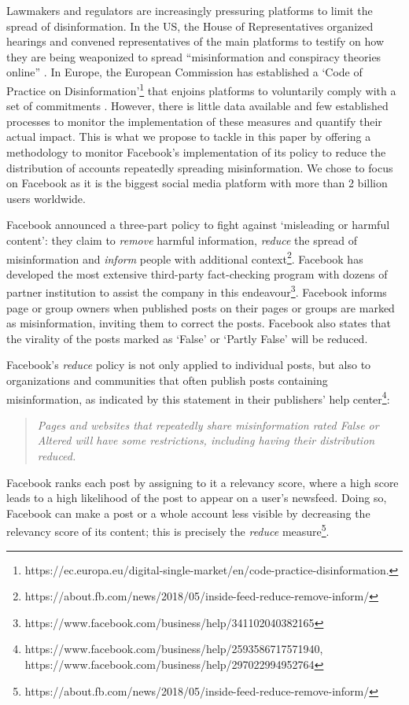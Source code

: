 \documentclass[11pt,a4paper]{article}
\begin{document}
Lawmakers and regulators are increasingly pressuring platforms to limit the spread of disinformation. 
In the US, the House of Representatives organized hearings and convened representatives of the main platforms to testify on how they are being weaponized to spread ``misinformation and conspiracy theories online'' \citep{donovan2020}. 
In Europe, the European Commission has established a `Code of Practice on Disinformation'\footnote{https://ec.europa.eu/digital-single-market/en/code-practice-disinformation.} that enjoins platforms to voluntarily comply with a set of commitments \citep{heldt2019let}. 
However, there is little data available and few established processes to monitor the implementation of these measures and quantify their actual impact. 
This is what we propose to tackle in this paper by offering a methodology to monitor Facebook’s implementation of its policy to reduce the distribution of accounts repeatedly spreading misinformation. 
We chose to focus on Facebook as it is the biggest social media platform with more than 2 billion users worldwide.

Facebook announced a three-part policy to fight against ‘misleading or harmful content’: they claim to \textit{remove} harmful information, \textit{reduce} the spread of misinformation and \textit{inform} people with additional context\footnote{https://about.fb.com/news/2018/05/inside-feed-reduce-remove-inform/}. 
Facebook has developed the most extensive third-party fact-checking program with dozens of partner institution to assist the company in this endeavour\footnote{https://www.facebook.com/business/help/341102040382165}.
Facebook informs page or group owners when published posts on their pages or groups are marked as misinformation, inviting them to correct the posts.
Facebook also states that the virality of the posts marked as `False' or `Partly False' will be reduced.

Facebook’s \textit{reduce} policy is not only applied to individual posts, but also to organizations and communities that often publish posts containing misinformation, as indicated by this statement in their publishers’ help center\footnote{https://www.facebook.com/business/help/2593586717571940, https://www.facebook.com/business/help/297022994952764}: 
\begin{quote}
\emph{Pages and websites that repeatedly share misinformation rated False or Altered will have some restrictions, including having their distribution reduced.}
\end{quote}
Facebook ranks each post by assigning to it a relevancy score, where a high score leads to a high likelihood of the post to appear on a user's newsfeed. 
Doing so, Facebook can make a post or a whole account less visible by decreasing the relevancy score of its content; this is precisely the {\it reduce} measure\footnote{https://about.fb.com/news/2018/05/inside-feed-reduce-remove-inform/}.
\end{document}

